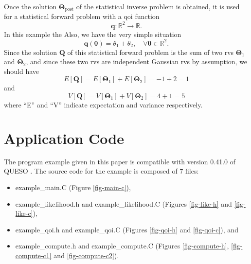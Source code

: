 Once the solution $\boldsymbol{\Theta}_{\text{post}}$ of the statistical inverse problem is obtained,
it is used for a statistical forward problem with a qoi function
\begin{equation*}
\mathbf{q}:\mathbb{R}^2\rightarrow\mathbb{R}.
\end{equation*}
In this example the 
Also, we have the very simple situation
\begin{equation}\label{eq-example-q}
\mathbf{q}(\boldsymbol{\theta}) = \theta_1+\theta_2,\quad\forall\boldsymbol{\theta}\in\mathbb{R}^2.
\end{equation}
Since the solution $\mathbf{Q}$ of this statistical forward problem is the sum of
two rvs $\boldsymbol{\Theta}_1$ and $\boldsymbol{\Theta}_2$,
and since these two rvs are independent Gaussian rvs by assumption, we should have
\begin{equation}\label{eq-example-E}
E[\mathbf{Q}] = E[\boldsymbol{\Theta}_1] + E[\boldsymbol{\Theta}_2] = -1 + 2 = 1
\end{equation}
and
\begin{equation}\label{eq-example-V}
V[\mathbf{Q}] = V[\boldsymbol{\Theta}_1] + V[\boldsymbol{\Theta}_2] = 4 + 1 = 5
\end{equation}
where ``E'' and ``V'' indicate expectation and variance respectively.

\clearpage
\section{Application Code}\label{sc-appl-code}

The program example given in this paper is compatible with version 0.41.0 of QUESO \cite{Pr09c}.
The source code for the example is composed of 7 files:
\begin{itemize}
\item example\_main.C (Figure \ref{fig-main-c}),
\item example\_likelihood.h and example\_likelihood.C (Figures \ref{fig-like-h} and \ref{fig-like-c}),
\item example\_qoi.h and example\_qoi.C (Figures \ref{fig-qoi-h} and \ref{fig-qoi-c}), and
\item example\_compute.h and example\_compute.C (Figures \ref{fig-compute-h}, \ref{fig-compute-c1} and \ref{fig-compute-c2}).
\end{itemize}

